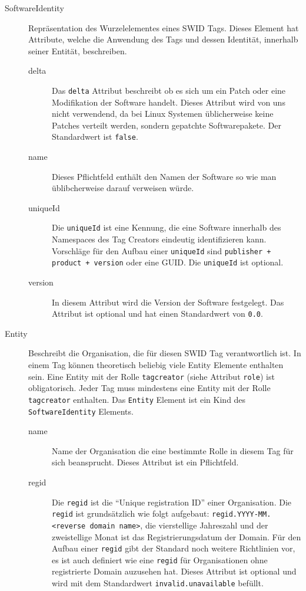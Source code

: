 \begin{description}
	\item[SoftwareIdentity] Repräsentation des Wurzelelementes eines SWID Tags.
	Dieses Element hat Attribute, welche die Anwendung des Tags und dessen Identität,
	innerhalb seiner Entität, beschreiben.
	\begin{description}
		\item[delta] Das \texttt{delta} Attribut beschreibt ob es sich um ein Patch
		oder eine Modifikation der Software handelt. Dieses Attribut wird von uns
		nicht verwendend, da bei Linux Systemen üblicherweise keine Patches verteilt
		werden, sondern gepatchte Softwarepakete. Der Standardwert ist \texttt{false}.

		\item[name] Dieses Pflichtfeld enthält den Namen der Software so wie man
		üblibcherweise darauf verweisen würde.
		
		\item[uniqueId] Die \texttt{uniqueId} ist eine Kennung, die eine Software
		innerhalb des Namespaces des Tag Creators eindeutig identifizieren kann.
		Vorschläge für den Aufbau einer \texttt{uniqueId} sind \texttt{publisher +
		product + version} oder eine GUID. Die \texttt{uniqueId} ist optional.
		
		\item[version] In diesem Attribut wird die Version der Software festgelegt.
		Das Attribut ist optional und hat einen Standardwert von \texttt{0.0}.
	\end{description}
	
	\item[Entity] Beschreibt die Organisation, die für diesen SWID Tag
	verantwortlich ist. In einem Tag können theoretisch beliebig viele Entity
	Elemente enthalten sein. Eine Entity mit der Rolle \texttt{tagcreator} (siehe
	Attribut \texttt{role}) ist obligatorisch. Jeder Tag muss mindestens eine
	Entity mit der Rolle \texttt{tagcreator} enthalten. Das \texttt{Entity} Element
	ist ein Kind des \texttt{SoftwareIdentity} Elements.
	\begin{description}
		\item[name] Name der Organisation die eine bestimmte Rolle in diesem Tag für
		sich beansprucht. Dieses Attribut ist ein Pflichtfeld.
		
		\item[regid] Die \texttt{regid} ist die \enquote{Unique registration ID} einer
		Organisation. Die \texttt{regid} ist grundsätzlich wie folgt aufgebaut:
		\texttt{regid.YYYY-MM.<reverse domain name>}, die vierstellige Jahreszahl und
		der zweistellige Monat ist das Registrierungsdatum der Domain. Für den Aufbau
		einer \texttt{regid} gibt der Standard noch weitere Richtlinien vor, es ist
		auch definiert wie eine \texttt{regid} für Organisationen ohne registrierte
		Domain auzusehen hat. Dieses Attribut ist optional und wird mit dem
		Standardwert \texttt{invalid.unavailable} befüllt.
		

\end{description}
\end{description}
